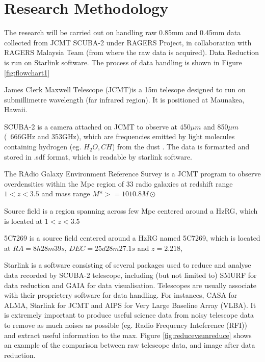 \documentclass{article}
\begin{document}
\section{Research Methodology}

The research will be carried out on handling raw 0.85mm and 0.45mm data collected from JCMT SCUBA-2 under RAGERS Project, in collaboration with RAGERS Malaysia Team (from where the raw data is acquired). Data Reduction is run on Starlink software. The process of data handling is shown in Figure \ref{fig:flowchart1}
\medskip

\noindent James Clerk Maxwell Telescope (JCMT)is a 15m telesope designed to run on submillimetre wavelength (far infrared region). It is positioned at Maunakea, Hawaii.
\medskip

\noindent SCUBA-2 is a camera attached on JCMT to observe at 450$\mu m$ and 850$\mu m$ (~666GHz and 353GHz), which are frequencies emitted by light molecules containing hydrogen (eg. $H_2O,CH$) from the dust \parencite{Phillips2013}. The data is formatted and stored in .sdf format, which is readable by starlink software.
\medskip

\noindent The RAdio Galaxy Environment Reference Survey is a JCMT program to observe overdensities within the Mpc region of 33 radio galaxies at redshift range $1 < z < 3.5$ and mass range $M\ast >=1010.8M\odot $ \parencite{Ragers2021}
\medskip

\noindent Source field is a region spanning across few Mpc centered around a HzRG, which is located at $1 < z < 3.5$ 
\medskip

\noindent 5C7269 is a source field centered around a HzRG named 5C7269, which is located at $RA = 8h28m39s$, $DEC = 25d28m27.1s$ and $z = 2.218$, 
\medskip

\noindent Starlink is a software consisting of several packages used to reduce and analyse data recorded by SCUBA-2 telescope, including (but not limited to) SMURF for data reduction and GAIA for data visualisation. Telescopes are usually associate with their proprietery software for data handling. For instances, CASA for ALMA, Starlink for JCMT and AIPS for Very Large Baseline Array (VLBA). It is extremely important to produce useful science data from noisy telescope data to remove as much noises as possible (eg. Radio Frequency Inteference (RFI)) and extract useful information to the max. Figure \ref{fig:reducevsunreduce} shows an example of the comparison between raw telescope data, and image after data reduction.
\end{document}
